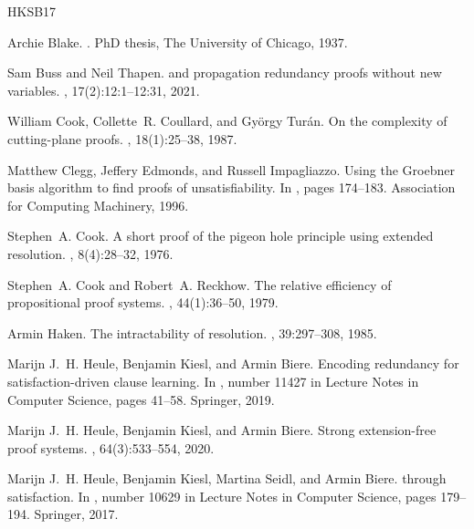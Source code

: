 \documentclass[10pt,a4paper]{article}
\begin{document}
\begin{thebibliography}{HKSB17}

  Archie Blake.
  .
  \newblock PhD thesis, The University of Chicago, 1937.

  Sam Buss and Neil Thapen.
   and propagation redundancy proofs without new variables.
  , 17(2):12:1--12:31, 2021.

  William Cook, Collette~R. Coullard, and Gy{\"o}rgy Tur{\'a}n.
  \newblock On the complexity of cutting-plane proofs.
  , 18(1):25--38, 1987.

  Matthew Clegg, Jeffery Edmonds, and Russell Impagliazzo.
  \newblock Using the {Groebner} basis algorithm to find proofs of
  unsatisfiability.
  \newblock In {\em {}}, pages 174--183. Association for Computing
  Machinery, 1996.

  Stephen~A. Cook.
  \newblock A short proof of the pigeon hole principle using extended resolution.
  , 8(4):28--32, 1976.

  Stephen~A. Cook and Robert~A. Reckhow.
  \newblock The relative efficiency of propositional proof systems.
  , 44(1):36--50, 1979.

  Armin Haken.
  \newblock The intractability of resolution.
  , 39:297--308, 1985.

  Marijn J.~H. Heule, Benjamin Kiesl, and Armin Biere.
  \newblock Encoding redundancy for satisfaction-driven clause learning.
  \newblock In {\em {}}, number 11427 in Lecture Notes in Computer
  Science, pages 41--58. Springer, 2019.

  Marijn J.~H. Heule, Benjamin Kiesl, and Armin Biere.
  \newblock Strong extension-free proof systems.
  , 64(3):533--554, 2020.

  Marijn J.~H. Heule, Benjamin Kiesl, Martina Seidl, and Armin Biere.
   through satisfaction.
  \newblock In {\em {}}, number 10629 in Lecture Notes in Computer Science,
  pages 179--194. Springer, 2017.


\end{thebibliography}
\end{document}
